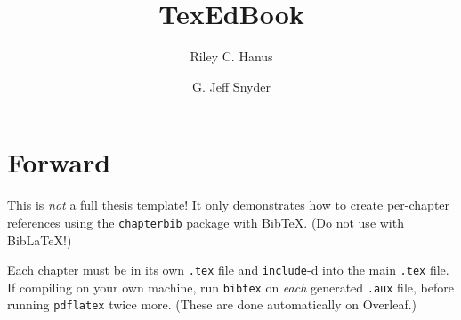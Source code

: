 \documentclass[11pt,oneside]{book}
\title{\Huge \textbf{TexEdBook}}
\author{Riley C. Hanus \and G. Jeff Snyder}
\begin{document}
\frontmatter
\maketitle

\chapter*{Forward}
This is \emph{not} a full thesis template! It only demonstrates how to create per-chapter references using the \texttt{chapterbib} package with BibTeX. (Do not use with BibLaTeX!)

Each chapter must be in its own \texttt{.tex} file and \texttt{include}-d into the main \texttt{.tex} file. If compiling on your own machine, run \texttt{bibtex} on \emph{each} generated \texttt{.aux} file, before running \texttt{pdflatex} twice more. (These are done automatically on Overleaf.)

\tableofcontents

\mainmatter






\backmatter

\end{document}
